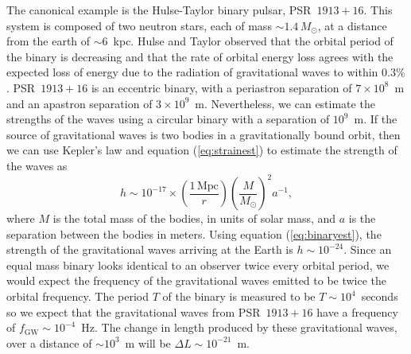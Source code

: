The canonical example is the Hulse-Taylor binary pulsar,
PSR~$1913+16$\cite{1975ApJ...195L..51H}. This system is composed of two
neutron stars, each of mass $\sim 1.4\,M_\odot$, at a distance from the earth
of $\sim 6$~kpc. Hulse and Taylor observed that the orbital period of the
binary is decreasing and that the rate of orbital energy loss agrees with the
expected loss of energy due to the radiation of gravitational waves to within
$0.3\%$\cite{Taylor:1982,Taylor:1989}. PSR~$1913+16$ is an eccentric binary,
with a periastron separation of $7\times10^{8}$~m and an apastron separation
of $3\times10^{9}$~m. Nevertheless, we can estimate the strengths of the waves
using a circular binary with a separation of $10^{9}$~m.  If the source of
gravitational waves is two bodies in a gravitationally bound orbit, then we
can use Kepler's law and equation (\ref{eq:strainest}) to estimate the
strength of the waves as
\begin{equation}
h \sim 10^{-17} \times \left(\frac{1\,\mathrm{Mpc}}{r}\right)
\left(\frac{M}{M_\odot}\right)^2 a^{-1},
\label{eq:binaryest}
\end{equation}
where $M$ is the total mass of the bodies, in units of solar mass, and $a$ is
the separation between the bodies in meters.
Using equation (\ref{eq:binaryest}), the strength of the gravitational waves
arriving at the Earth is $h \sim 10^{-24}$. Since an equal mass binary looks
identical to an observer twice every orbital period, we would expect the
frequency of the gravitational waves emitted to be twice the orbital
frequency. The period $T$ of the binary is measured to be $T\sim 10^4$~seconds
so we expect that the gravitational waves from PSR~$1913+16$ have a frequency
of $f_\mathrm{GW} \sim 10^{-4}$~Hz.  The change in length produced by these
gravitational waves, over a distance of $\sim 10^3$~m will be $\Delta L \sim
10^{-21}$~m.

